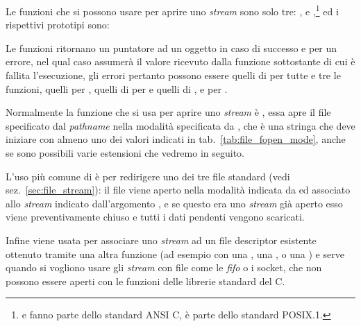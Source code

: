 Le funzioni che si possono usare per aprire uno \textit{stream} sono solo tre:
,  e ,\footnote{ e
   fanno parte dello standard ANSI C,  è parte
  dello standard POSIX.1.} ed i rispettivi prototipi sono:

\begin{funcproto}{
}

{Le funzioni ritornano un puntatore ad un oggetto  in caso di
  successo e  per un errore, nel qual caso  assumerà il
  valore ricevuto dalla funzione sottostante di cui è fallita l'esecuzione,
  gli errori pertanto possono essere quelli di  per tutte e tre
  le funzioni, quelli  per , quelli di  per
   e quelli di ,  e  per
  .}
\end{funcproto}

Normalmente la funzione che si usa per aprire uno \textit{stream} è
, essa apre il file specificato dal \textit{pathname} 
nella modalità specificata da , che è una stringa che deve
iniziare con almeno uno dei valori indicati in tab.~\ref{tab:file_fopen_mode},
anche se sono possibili varie estensioni che vedremo in seguito.

L'uso più comune di  è per redirigere uno dei tre file standard
(vedi sez.~\ref{sec:file_stream}): il file  viene aperto nella
modalità indicata da  ed associato allo \textit{stream} indicato
dall'argomento , e se questo era uno \textit{stream} già aperto
esso viene preventivamente chiuso e tutti i dati pendenti vengono scaricati.

Infine  viene usata per associare uno \textit{stream} ad un file
descriptor esistente ottenuto tramite una altra funzione (ad esempio con una
, una , o una ) e serve quando si vogliono
usare gli \textit{stream} con file come le \textit{fifo} o i socket, che non possono
essere aperti con le funzioni delle librerie standard del C.


